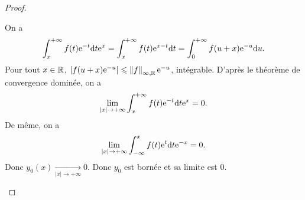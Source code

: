\documentclass[12pt]{article}
\begin{document}
\begin{proof}
\begin{enumerate}
		On a 
		\begin{equation}
			\int_{x}^{+\infty}f(t)\mathrm{e}^{-t}\mathrm{d} t\mathrm{e}^{x}=\int_{x}^{+\infty}f(t)\mathrm{e}^{x-t}\mathrm{d} t=\int_{0}^{+\infty}f(u+x)\mathrm{e}^{-u}\mathrm{d} u.
		\end{equation}
		Pour tout $x\in\mathbb{R}$, $\left\lvert f(u+x)\mathrm{e}^{-u}\right\rvert\leqslant\left\lVert f\right\rVert_{\infty,\mathbb{R}}\mathrm{e}^{-u}$, intégrable. D'après le théorème de convergence dominée, on a 
		\begin{equation}
			\lim\limits_{\left\lvert x\right\rvert\to+\infty}\int_{x}^{+\infty}f(t)\mathrm{e}^{-t}\mathrm{d} t\mathrm{e}^{x}=0.
		\end{equation}
		De même, on a 
		\begin{equation}
			\lim\limits_{\left\lvert x\right\rvert\to+\infty}\int_{-\infty}^{x}f(t)\mathrm{e}^{t}\mathrm{d} t\mathrm{e}^{-x}=0.
		\end{equation}
		Donc $y_0(x)\xrightarrow[\left\lvert x\right\rvert\to+\infty]{}0$. Donc $y_0$ est bornée et sa limite est 0.
	\end{enumerate}
\end{proof}
\end{document}
